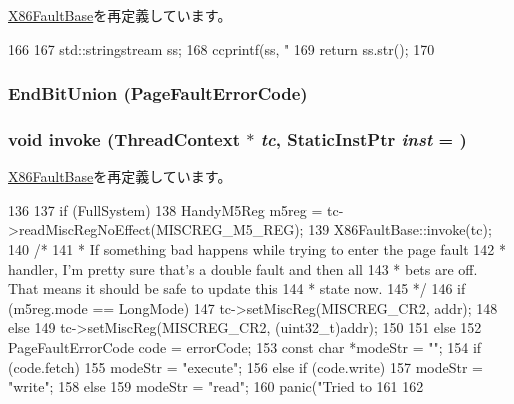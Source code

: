 \hyperlink{classX86ISA_1_1X86FaultBase_a1d7f1c12bd9a77eda766e6e8dca31e50}{X86FaultBase}を再定義しています。


\begin{DoxyCode}
166     {
167         std::stringstream ss;
168         ccprintf(ss, "%
169         return ss.str();
170     }
\end{DoxyCode}
\hypertarget{classX86ISA_1_1PageFault_a02b72810071333f2a5f8d3ea7538add6}{
\subsubsection[{EndBitUnion}]{\setlength{\rightskip}{0pt plus 5cm}EndBitUnion (PageFaultErrorCode)}}
\label{classX86ISA_1_1PageFault_a02b72810071333f2a5f8d3ea7538add6}
\hypertarget{classX86ISA_1_1PageFault_a2bd783b42262278d41157d428e1f8d6f}{
\subsubsection[{invoke}]{\setlength{\rightskip}{0pt plus 5cm}void invoke ({\bf ThreadContext} $\ast$ {\em tc}, \/  {\bf StaticInstPtr} {\em inst} = {})}}
\label{classX86ISA_1_1PageFault_a2bd783b42262278d41157d428e1f8d6f}


\hyperlink{classX86ISA_1_1X86FaultBase_a2bd783b42262278d41157d428e1f8d6f}{X86FaultBase}を再定義しています。


\begin{DoxyCode}
136     {
137         if (FullSystem) {
138             HandyM5Reg m5reg = tc->readMiscRegNoEffect(MISCREG_M5_REG);
139             X86FaultBase::invoke(tc);
140             /*
141              * If something bad happens while trying to enter the page fault
142              * handler, I'm pretty sure that's a double fault and then all
143              * bets are off. That means it should be safe to update this
144              * state now.
145              */
146             if (m5reg.mode == LongMode) {
147                 tc->setMiscReg(MISCREG_CR2, addr);
148             } else {
149                 tc->setMiscReg(MISCREG_CR2, (uint32_t)addr);
150             }
151         } else {
152             PageFaultErrorCode code = errorCode;
153             const char *modeStr = "";
154             if (code.fetch)
155                 modeStr = "execute";
156             else if (code.write)
157                 modeStr = "write";
158             else
159                 modeStr = "read";
160             panic("Tried to %
161         }
162     }
\end{DoxyCode}


